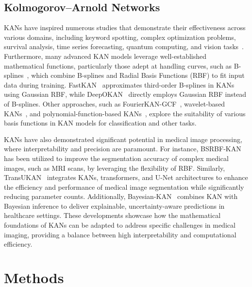\documentclass[times,twocolumn,final]{elsarticle}
\begin{document}
\subsection{Kolmogorov–Arnold Networks}
KANs have inspired numerous studies that demonstrate their effectiveness across various domains, including keyword spotting, complex optimization problems, survival analysis, time series forecasting, quantum computing, and vision tasks~\cite{li2024u,cheon2024demonstrating,ge2024tc}. Furthermore, many advanced KAN models leverage well-established mathematical functions, particularly those adept at handling curves, such as B-splines~\cite{ta2024bsrbf}, which combine B-splines and Radial Basis Functions (RBF) to fit input data during training. FastKAN~\cite{li2024kolmogorov} approximates third-order B-splines in KANs using Gaussian RBF, while DeepOKAN~\cite{abueidda2024deepokan} directly employs Gaussian RBF instead of B-splines. Other approaches, such as FourierKAN-GCF~\cite{xu2024fourierkan}, wavelet-based KANs~\cite{seydi2024unveiling}, and polynomial-function-based KANs~\cite{teymoor2024exploring}, explore the suitability of various basis functions in KAN models for classification and other tasks.

KANs have also demonstrated significant potential in medical image processing, where interpretability and precision are paramount. For instance, BSRBF-KAN~\cite{ta2024bsrbf} has been utilized to improve the segmentation accuracy of complex medical images, such as MRI scans, by leveraging the flexibility of RBF. Similarly, TransUKAN~\cite{wu2024transukan} integrates KANs, transformers, and U-Net architectures to enhance the efficiency and performance of medical image segmentation while significantly reducing parameter counts. Additionally, Bayesian-KAN~\cite{hassan2024bayesian} combines KAN with Bayesian inference to deliver explainable, uncertainty-aware predictions in healthcare settings. These developments showcase how the mathematical foundations of KANs can be adapted to address specific challenges in medical imaging, providing a balance between high interpretability and computational efficiency.


\section{Methods}
\end{document}

